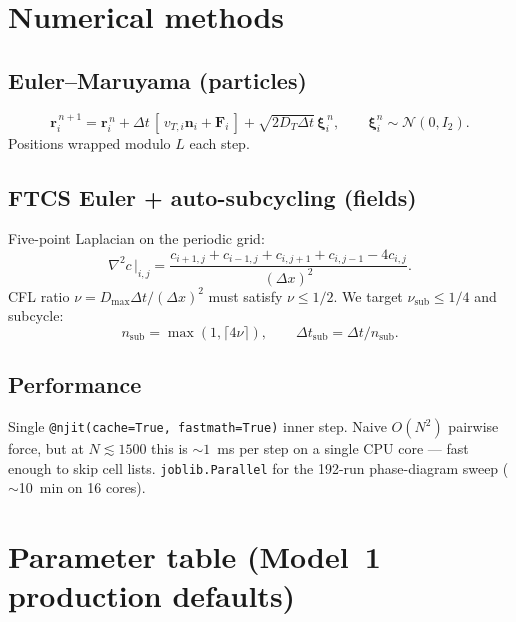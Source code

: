 \documentclass[11pt,letterpaper]{article}
\begin{document}
\section{Numerical methods}

\subsection{Euler--Maruyama (particles)}
\begin{equation}
\mathbf{r}_i^{\,n+1} = \mathbf{r}_i^{\,n}
   + \Delta t\,[\,v_{T,i}\mathbf{n}_i + \mathbf{F}_i\,]
   + \sqrt{2 D_T \Delta t}\,\bm{\xi}_i^{\,n}, \qquad
\bm{\xi}_i^n \sim \mathcal{N}(0, I_2).
\end{equation}
Positions wrapped modulo $L$ each step.

\subsection{FTCS Euler + auto-subcycling (fields)}
Five-point Laplacian on the periodic grid:
\begin{equation}
\nabla^2 c\,\big|_{i,j} =
   \frac{c_{i+1,j} + c_{i-1,j} + c_{i,j+1} + c_{i,j-1} - 4 c_{i,j}}{(\Delta x)^2}.
\end{equation}
CFL ratio $\nu = D_{\max}\Delta t/(\Delta x)^2$ must satisfy
$\nu \le 1/2$. We target $\nu_{\text{sub}} \le 1/4$ and subcycle:
\begin{equation}
n_{\text{sub}} = \max(1, \lceil 4\nu\rceil), \qquad
\Delta t_{\text{sub}} = \Delta t / n_{\text{sub}}.
\end{equation}

\subsection{Performance}
Single \texttt{@njit(cache=True, fastmath=True)} inner step. Naive
$O(N^2)$ pairwise force, but at $N \lesssim 1500$ this is ${\sim}1$~ms
per step on a single CPU core --- fast enough to skip cell lists.
\texttt{joblib.Parallel} for the 192-run phase-diagram sweep ($\sim$10~min
on 16 cores).

\section{Parameter table (Model~1 production defaults)}
\label{sec:m1-params}
\end{document}
